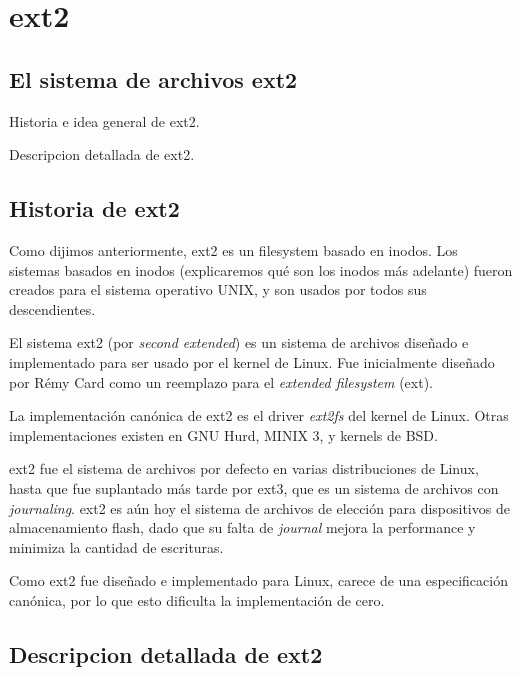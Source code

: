 \section{ext2}

\subsection{El sistema de archivos ext2}
\begin{puntos}
  \item Historia e idea general de ext2.
  \item Descripcion detallada de ext2.
\end{puntos}

\subsection{Historia de ext2}

Como dijimos anteriormente, ext2 es un filesystem basado en inodos. Los sistemas basados en inodos (explicaremos qué son los inodos más adelante) fueron creados para el sistema operativo UNIX, y son usados por todos sus descendientes.

El sistema ext2 (por \emph{second extended}) es un sistema de archivos diseñado e implementado para ser usado por el kernel de Linux. Fue inicialmente diseñado por Rémy Card como un reemplazo para el \emph{extended filesystem} (ext).

La implementación canónica de ext2 es el driver \emph{ext2fs} del kernel de Linux. Otras implementaciones existen en GNU Hurd, MINIX 3, y kernels de BSD.

ext2 fue el sistema de archivos por defecto en varias distribuciones de Linux, hasta que fue suplantado más tarde por ext3, que es un sistema de archivos con \emph{journaling}.
ext2 es aún hoy el sistema de archivos de elección para dispositivos de almacenamiento flash, dado que su falta de \emph{journal} mejora la performance y minimiza la cantidad de escrituras. 


Como ext2 fue diseñado e implementado para Linux, carece de una especificación canónica, por lo que esto dificulta la implementación de cero.

\subsection{Descripcion detallada de ext2}

